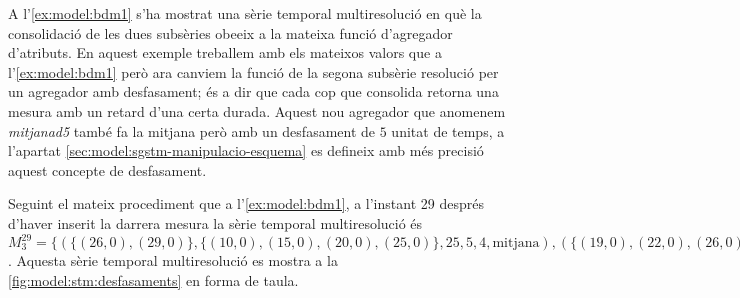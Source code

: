\begin{example} 
\label{ex:model:bdm-desfasaments}

A l'\autoref{ex:model:bdm1} s'ha mostrat una sèrie temporal
multiresolució en què la consolidació de les dues subsèries obeeix
a la mateixa funció d'agregador d'atributs. En aquest exemple
treballem amb els mateixos valors que a l'\autoref{ex:model:bdm1} però
ara canviem la funció de la segona subsèrie resolució per un agregador
amb desfasament; és a dir que cada cop que consolida retorna una
mesura amb un retard d'una certa durada. Aquest nou agregador que
anomenem \emph{mitjanad5} també fa la mitjana però amb un desfasament
de $5$ unitat de temps, a l'apartat
\ref{sec:model:sgstm-manipulacio-esquema} es defineix amb més precisió
aquest concepte de desfasament.


Seguint el mateix procediment que a l'\autoref{ex:model:bdm1}, a
l'instant 29 després d'haver inserit la darrera mesura la sèrie
temporal multiresolució és $M_3^{29} = \{ ( \{(26,0),(29,0)\} ,
\{(10,0),(15,0),(20,0),(25,0)\} , 25 , 5 ,4 , \text{mitjana} ) , (
\{(19,0),(22,0),(26,0),(29,0)\} , \{\allowbreak(5,0),(15,0)\} , 20 , 10 ,3 ,
\text{mitjanad5} ) \}$.  Aquesta sèrie temporal multiresolució es
mostra a la \autoref{fig:model:stm:desfasaments} en forma de taula.



\end{example}

